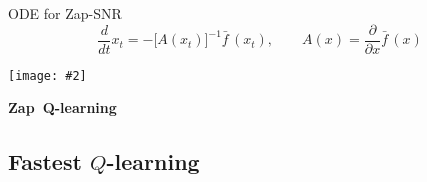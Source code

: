 \documentclass[xcolor=dvipsnames, subsection=false]{beamer}
\newcounter{temp}
\newenvironment{framesection}%
{\setcounter{temp}{\value{framenumber}}
\begin{frame}
\thispagestyle{empty}
}%
{\end{frame}\setcounter{framenumber}{\value{temp}}}
\def\barf{{\bar f}}
\def\clA{{\mathcal A}}
\def\ddt{\frac{d}{dt}}
\def\Ebox#1#2{%
 \begin{center}
\texttt{[image: \#2]}
 \end{center}
 }
\begin{document}
\begin{frame}
\begin{minipage}[t][10cm][t]{\textwidth}
{\begin{center}
\begin{alertblock}{ODE for Zap-SNR}
\begin{equation*}
\ddt x_t =  - \bigl[  A(x_t) \bigr]^{-1} \barf\, (x_t), \qquad A(x) = \frac{\partial }{ \partial x} \barf\, (x)
\end{equation*}
\end{alertblock}
\end{center}
}


\end{minipage}
\end{frame}

\begin{framesection}
	
	\centering
	
	\Ebox{.85}{Fig2_mystery.pdf}
	
	\vfill
	\Large\bf  Zap~Q-learning
	
\end{framesection}

\subsection{Fastest $Q$-learning}
\end{document}
